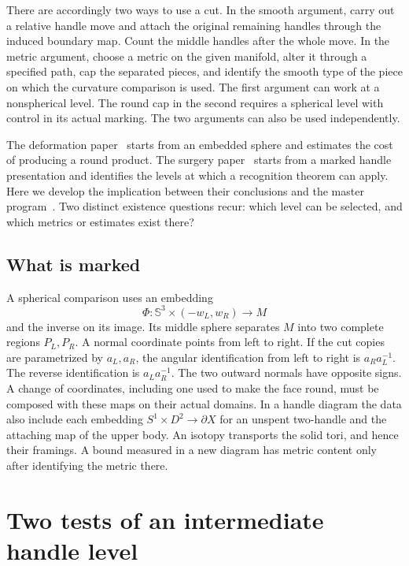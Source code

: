 \documentclass[11pt,letterpaper]{article}
\numberwithin{equation}{section}
\newcommand{\Sph}{\mathbb S}
\begin{document}
There are accordingly two ways to use a cut. In the smooth argument,
carry out a relative handle move and attach the original remaining
handles through the induced boundary map. Count the middle handles
after the whole move. In the metric argument, choose a metric on the
given manifold, alter it through a specified path, cap the separated
pieces, and identify the smooth type of the piece on which the curvature
comparison is used. The first argument can work at a nonspherical
level. The round cap in the second requires a spherical level with
control in its actual marking. The two arguments can also be used
independently.

The deformation paper~\cite{Baker2026CollarDeformation} starts from an
embedded sphere and estimates the cost of producing a round product.
The surgery paper~\cite{Baker2026HandleCuts} starts from a marked
handle presentation and identifies the levels at which a recognition
theorem can apply. Here we develop the implication between their
conclusions and the master program~\cite{Baker2026ChiralMaster}. Two
distinct existence questions recur: which level can be selected, and
which metrics or estimates exist there?

\subsection{What is marked}

A spherical comparison uses an embedding
\[
 \Phi:\Sph^3\times(-w_L,w_R)\longrightarrow M
\]
and the inverse on its image. Its middle sphere separates \(M\) into
two complete regions \(P_L,P_R\). A normal coordinate points from left
to right. If the cut copies are parametrized by \(a_L,a_R\), the
angular identification from left to right is \(a_Ra_L^{-1}\). The
reverse identification is \(a_La_R^{-1}\). The two outward normals
have opposite signs. A change of coordinates, including one used to
make the face round, must be composed with these maps on their actual
domains. In a handle diagram the data also include each embedding
\(S^1\times D^2\to\partial X\) for an unspent two-handle and the
attaching map of the upper body. An isotopy transports the solid tori,
and hence their framings. A bound measured in a new diagram has metric
content only after identifying the metric there.

\section{Two tests of an intermediate handle level}\label{sec:handles}
\end{document}
